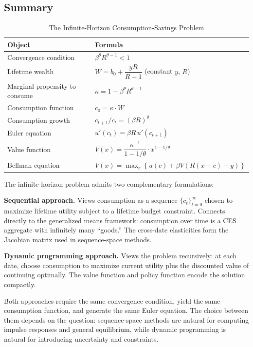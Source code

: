\subsection{Summary}
\label{subsec:infinite-summary}

\begin{table}[H]
\centering
\caption{The Infinite-Horizon Consumption-Savings Problem}
\label{tab:infinite-summary}
\renewcommand{\arraystretch}{1.6}
\begin{tabular}{@{}ll@{}}
\toprule
\textbf{Object} & \textbf{Formula} \\
\midrule
Convergence condition & $\beta^\theta R^{\theta - 1} < 1$ \\[6pt]
Lifetime wealth & $W = b_0 + \dfrac{yR}{R-1}$ \quad (constant $y$, $R$) \\[6pt]
Marginal propensity to consume & $\kappa = 1 - \beta^\theta R^{\theta - 1}$ \\[6pt]
Consumption function & $c_0 = \kappa \cdot W$ \\[6pt]
Consumption growth & $c_{t+1}/c_t = (\beta R)^\theta$ \\[6pt]
Euler equation & $u'(c_t) = \beta R \, u'(c_{t+1})$ \\[6pt]
Value function & $V(x) = \dfrac{\kappa^{-1}}{1 - 1/\theta} \cdot x^{1-1/\theta}$ \\[6pt]
Bellman equation & $V(x) = \max_c \left\{ u(c) + \beta V(R(x-c) + y) \right\}$ \\[6pt]
\bottomrule
\end{tabular}
\end{table}

\begin{callouttip}
The infinite-horizon problem admits two complementary formulations:

\medskip
\textbf{Sequential approach.} Views consumption as a sequence $\{c_t\}_{t=0}^\infty$ chosen to maximize lifetime utility subject to a lifetime budget constraint. Connects directly to the generalized means framework: consumption over time is a CES aggregate with infinitely many ``goods.'' The cross-date elasticities form the Jacobian matrix used in sequence-space methods.

\medskip
\textbf{Dynamic programming approach.} Views the problem recursively: at each date, choose consumption to maximize current utility plus the discounted value of continuing optimally. The value function and policy function encode the solution compactly.

\medskip
Both approaches require the same convergence condition, yield the same consumption function, and generate the same Euler equation. The choice between them depends on the question: sequence-space methods are natural for computing impulse responses and general equilibrium, while dynamic programming is natural for introducing uncertainty and constraints.
\end{callouttip}
